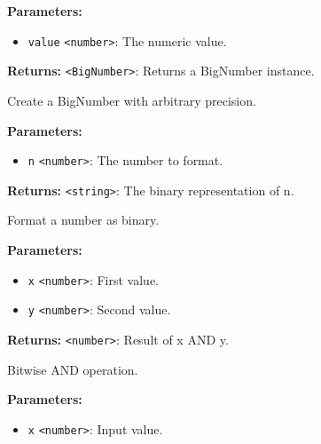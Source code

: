 \documentclass[12pt,a4paper]{article}
\begin{document}
\noindent \textbf{Parameters:}
\begin{itemize}
  \item \texttt{value} \texttt{<number>}: The numeric value.
\end{itemize}

\noindent \textbf{Returns:} \texttt{<BigNumber>}: Returns a BigNumber instance.

\noindent Create a BigNumber with arbitrary precision.

\vspace{5mm}
\noindent {}


\noindent \textbf{Parameters:}
\begin{itemize}
  \item \texttt{n} \texttt{<number>}: The number to format.
\end{itemize}

\noindent \textbf{Returns:} \texttt{<string>}: The binary representation of \textasciigrave{}n\textasciigrave{}.

\noindent Format a number as binary.

\vspace{5mm}
\noindent {}


\noindent \textbf{Parameters:}
\begin{itemize}
  \item \texttt{x} \texttt{<number>}: First value.
  \item \texttt{y} \texttt{<number>}: Second value.
\end{itemize}

\noindent \textbf{Returns:} \texttt{<number>}: Result of \textasciigrave{}x AND y\textasciigrave{}.

\noindent Bitwise AND operation.

\vspace{5mm}
\noindent {}


\noindent \textbf{Parameters:}
\begin{itemize}
  \item \texttt{x} \texttt{<number>}: Input value.
\end{itemize}
\end{document}
